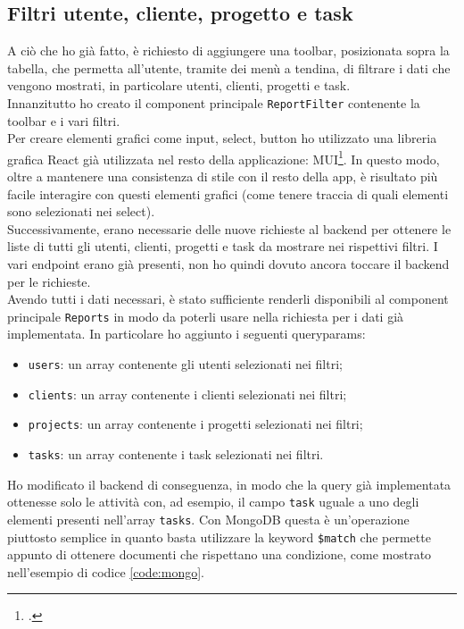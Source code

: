 \subsection{Filtri utente, cliente, progetto e task}
\noindent A ciò che ho già fatto, è richiesto di aggiungere una toolbar, posizionata sopra la tabella, che permetta all'utente, tramite dei menù a tendina, di filtrare i dati che vengono mostrati, in particolare utenti, clienti, progetti e task. \\
Innanzitutto ho creato il component principale \texttt{ReportFilter} contenente la toolbar e i vari filtri. \\
Per creare elementi grafici come input, select, button ho utilizzato una libreria grafica React già utilizzata nel resto della applicazione: MUI\footcite{site:mui}. In questo modo, oltre a mantenere una consistenza di stile con il resto della app, è risultato più facile interagire con questi elementi grafici (come tenere traccia di quali elementi sono selezionati nei select).\\
Successivamente, erano necessarie delle nuove richieste al backend per ottenere le liste di tutti gli utenti, clienti, progetti e task da mostrare nei rispettivi filtri. I vari endpoint erano già presenti, non ho quindi dovuto ancora toccare il backend per le richieste.\\
Avendo tutti i dati necessari, è stato sufficiente renderli disponibili al component principale \texttt{Reports} in modo da poterli usare nella richiesta per i dati già implementata. In particolare ho aggiunto i seguenti queryparams:
\begin{itemize}
  \item \texttt{users}: un array contenente gli utenti selezionati nei filtri;
  \item \texttt{clients}: un array contenente i clienti selezionati nei filtri;
  \item \texttt{projects}: un array contenente i progetti selezionati nei filtri;
  \item \texttt{tasks}: un array contenente i task selezionati nei filtri.
\end{itemize}
Ho modificato il backend di conseguenza, in modo che la query già implementata ottenesse solo le attività con, ad esempio, il campo \texttt{task} uguale a uno degli elementi presenti nell'array \texttt{tasks}. Con MongoDB questa è un'operazione piuttosto semplice in quanto basta utilizzare la keyword \texttt{\$match} che permette appunto di ottenere documenti che rispettano una condizione, come mostrato nell'esempio di codice \ref{code:mongo}.

